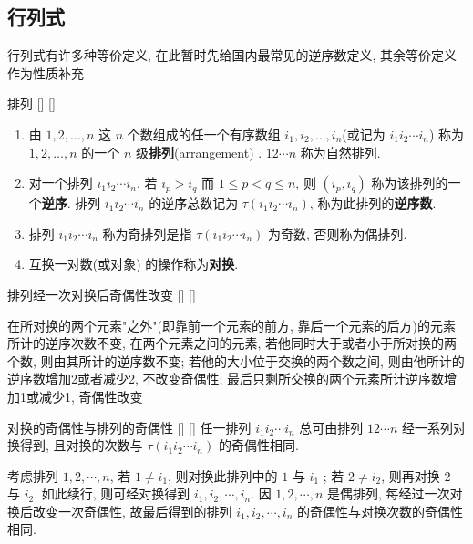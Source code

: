 \documentclass[UTF8]{ctexart}
\DeclareMathOperator{\0}{\mathbf{0}}
\DeclareMathOperator{\<}{\langle}
\renewcommand{\>}{\rangle}
\begin{document}
	\subsection{行列式}
        行列式有许多种等价定义, 在此暂时先给国内最常见的逆序数定义, 其余等价定义作为性质补充
        \begin{dfn}
			[]
			{排列}
			[]
			[]
        \begin{enumerate}
    \item 由 \(1, 2, \ldots, n\) 这 \(n\) 个数组成的任一个有序数组 \(i_1, i_2, \ldots, i_n\)(或记为 \(i_1 i_2 \cdots i_n\)) 称为 \(1, 2, \ldots, n\) 的一个 \(n\) 级\textbf{排列}(arrangement) . \(1 2 \cdots n\) 称为自然排列. 
    
    \item 对一个排列 \(i_1 i_2 \cdots i_n\), 若 \(i_p > i_q\) 而 \(1 \leq p < q \leq n\), 则 \((i_p, i_q)\) 称为该排列的一个\textbf{逆序}. 排列 \(i_1 i_2 \cdots i_n\) 的逆序总数记为 \(\tau(i_1 i_2 \cdots i_n)\), 称为此排列的\textbf{逆序数}. 

    \item 排列 \(i_1 i_2 \cdots i_n\) 称为奇排列是指 \(\tau(i_1 i_2 \cdots i_n)\) 为奇数, 否则称为偶排列. 

    \item 互换一对数(或对象) 的操作称为\textbf{对换}. 
        \end{enumerate}
        \end{dfn}
        \begin{ppt}
			[]
			{排列经一次对换后奇偶性改变}
			[]
			[]
        \end{ppt}
        \begin{prf}
            在所对换的两个元素"之外"(即靠前一个元素的前方, 靠后一个元素的后方)的元素所计的逆序次数不变, 在两个元素之间的元素, 若他同时大于或者小于所对换的两个数, 则由其所计的逆序数不变; 若他的大小位于交换的两个数之间, 则由他所计的逆序数增加2或者减少2, 不改变奇偶性; 最后只剩所交换的两个元素所计逆序数增加1或减少1, 奇偶性改变
        \end{prf}
        \begin{ppt}
			[]
			{对换的奇偶性与排列的奇偶性}
			[]
			[]
            任一排列  \(i_{1} i_{2} \cdots i_{n}\)  总可由排列  \(12 \cdots n\)  经一系列对换得到, 且对换的次数与  \(\tau(i_{1} i_{2} \cdots i_{n})\)  的奇偶性相同. 
        \end{ppt}
        \begin{prf}
            考虑排列  \(1, 2, \cdots, n\), 若  \(1 \neq i_1\), 则对换此排列中的  \(1\)  与  \(i_1\) ; 若  \(2 \neq i_2\), 则再对换  \(2\)  与  \(i_2\). 
            如此续行, 则可经对换得到  \(i_1, i_2, \cdots, i_n\). 因  \(1, 2, \cdots, n\)  是偶排列, 每经过一次对换后改变一次奇偶性, 故最后得到的排列  \(i_1, i_2, \cdots, i_n\)  的奇偶性与对换次数的奇偶性相同. 

        \end{prf}
	
\end{document}
